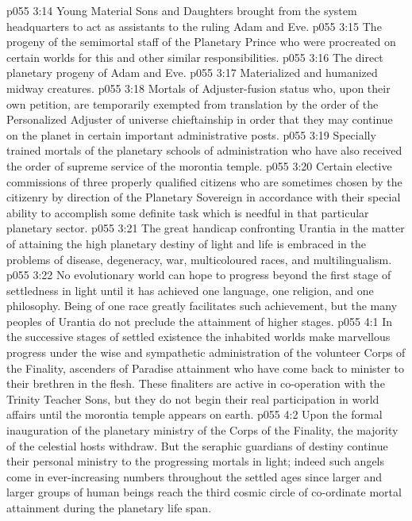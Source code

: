 \vs p055 3:14 \bibnobreakspace Young Material Sons and Daughters brought from the system headquarters to act as assistants to the ruling Adam and Eve.
\vs p055 3:15 \bibnobreakspace The progeny of the semimortal staff of the Planetary Prince who were procreated on certain worlds for this and other similar responsibilities.
\vs p055 3:16 \bibnobreakspace The direct planetary progeny of Adam and Eve.
\vs p055 3:17 \bibnobreakspace Materialized and humanized midway creatures.
\vs p055 3:18 \bibnobreakspace Mortals of Adjuster\hyp{}fusion status who, upon their own petition, are temporarily exempted from translation by the order of the Personalized Adjuster of universe chieftainship in order that they may continue on the planet in certain important administrative posts.
\vs p055 3:19 \bibnobreakspace Specially trained mortals of the planetary schools of administration who have also received the order of supreme service of the morontia temple.
\vs p055 3:20 \bibnobreakspace Certain elective commissions of three properly qualified citizens who are sometimes chosen by the citizenry by direction of the Planetary Sovereign in accordance with their special ability to accomplish some definite task which is needful in that particular planetary sector.
\vs p055 3:21 \pc The great handicap confronting Urantia in the matter of attaining the high planetary destiny of light and life is embraced in the problems of disease, degeneracy, war, multicoloured races, and multilingualism.
\vs p055 3:22 No evolutionary world can hope to progress beyond the first stage of settledness in light until it has achieved one language, one religion, and one philosophy. Being of one race greatly facilitates such achievement, but the many peoples of Urantia do not preclude the attainment of higher stages.
\vs p055 4:1 In the successive stages of settled existence the inhabited worlds make marvellous progress under the wise and sympathetic administration of the volunteer Corps of the Finality, ascenders of Paradise attainment who have come back to minister to their brethren in the flesh. These finaliters are active in co\hyp{}operation with the Trinity Teacher Sons, but they do not begin their real participation in world affairs until the morontia temple appears on earth.
\vs p055 4:2 Upon the formal inauguration of the planetary ministry of the Corps of the Finality, the majority of the celestial hosts withdraw. But the seraphic guardians of destiny continue their personal ministry to the progressing mortals in light; indeed such angels come in ever\hyp{}increasing numbers throughout the settled ages since larger and larger groups of human beings reach the third cosmic circle of co\hyp{}ordinate mortal attainment during the planetary life span.
